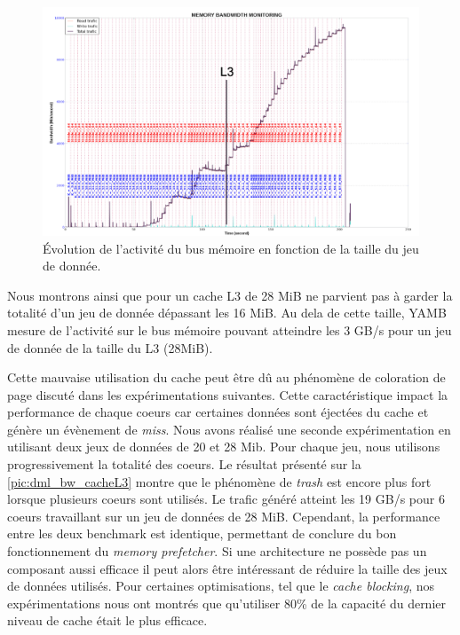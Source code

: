          \begin{figure}
        \center
        \includegraphics[width=14cm]{images/dml_L3_sharing.png}
        \caption{\label{pic:dml_L3_sharing} Évolution de l'activité du bus mémoire en fonction de la taille du jeu de donnée.}
        \end{figure}
        
        Nous montrons ainsi que pour un cache L3 de 28 MiB ne parvient pas à garder la totalité d'un jeu de donnée dépassant les 16 MiB. Au dela de cette taille, YAMB mesure de l'activité sur le bus mémoire pouvant atteindre les 3 GB/s pour un jeu de donnée de la taille du L3 (28MiB). 
        
        
        Cette mauvaise utilisation du cache peut être dû au phénomène de coloration de page discuté dans les expérimentations suivantes. Cette caractéristique impact la performance de chaque coeurs car certaines données sont éjectées du cache et génère un évènement de \textit{miss}. Nous avons réalisé une seconde expérimentation en utilisant deux jeux de données de 20 et 28 Mib. Pour chaque jeu, nous utilisons progressivement la totalité des coeurs. Le résultat présenté sur la \autoref{pic:dml_bw_cacheL3} montre que le phénomène de \textit{trash} est encore plus fort lorsque plusieurs coeurs sont utilisés. Le trafic généré atteint les 19 GB/s pour 6 coeurs travaillant sur un jeu de données de 28 MiB. Cependant, la performance entre les deux benchmark est identique, permettant de conclure du bon fonctionnement du \textit{memory prefetcher}. Si une architecture ne possède pas un composant aussi efficace il peut alors être intéressant de réduire la taille des jeux de données utilisés. Pour certaines optimisations, tel que le \textit{cache blocking}, nos expérimentations nous ont montrés que qu'utiliser 80\% de la capacité du dernier niveau de cache était le plus efficace.
        
